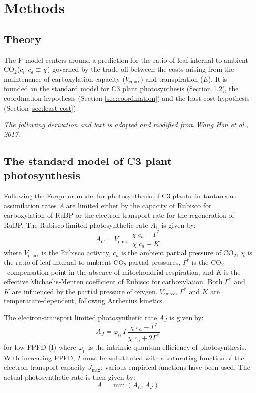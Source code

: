 \documentclass{myreport}
\newcommand{\coo}{CO$_2$}
\begin{document}
\section{Methods}

\subsection{Theory}
\label{sec:theory}
The P-model centers around a prediction for the ratio of leaf-internal to ambient \coo ($c_i : c_a \equiv \chi$) governed by the trade-off between the costs arising from the maintenance of carboxylation capacity ($V_{\mathrm{cmax}}$) and transpiration ($E$). 
It is founded on the standard model for C3 plant photosynthesis (Section \ref{sec:farquhar}), the coordination hypothesis (Section \ref{sec:coordination}) and the least-cost hypothesis (Section \ref{sec:least-cost}).

\textit{The following derivation and text is adopted and modified from Wang Han et al., 2017.}\\

\subsection{The standard model of C3 plant photosynthesis}
\label{sec:farquhar}
Following the Farquhar model for photosynthesis of C3 plants, instantaneous assimilation rates $A$ are limited either by the capacity of Rubisco for carboxylation of RuBP or the electron transport rate for the regeneration of RuBP. 
The Rubisco-limited photosynthetic rate $A_C$ is given by:
\begin{equation}
\label{eq:rubiscolimited}
    A_C = V_{\mathrm{cmax}} \; \frac{\chi\;c_a-\Gamma^{\ast}}{\chi\;c_a + K}
\end{equation}
where $V_{\mathrm{cmax}}$ is the Rubisco activity, $c_a$ is the ambient partial pressure of CO$_2$, $\chi$ is the ratio of leaf-internal to ambient CO$_2$ partial pressures, $\Gamma^{\ast}$ is the \coo\ compensation point in the absence of mitochondrial respiration, and $K$ is the effective Michaelis-Menten coefficient of Rubisco for carboxylation. 
Both $\Gamma^{\ast}$ and $K$ are influenced by the partial pressure of oxygen. 
$V_{\mathrm{cmax}}$, $\Gamma^{\ast}$ and $K$ are temperature-dependent, following Arrhenius kinetics.

The electron-transport limited photosynthetic rate $A_J$ is given by:
\begin{equation}
\label{eq:lightlimited}
    A_J = \varphi_0 \; I\; \frac{\chi \; c_a - \Gamma^{\ast}}{\chi\;c_a + 2\Gamma^{\ast}}
\end{equation}
for low PPFD (I) where $\varphi_0$ is the intrinsic quantum efficiency of photosynthesis. 
With increasing PPFD, $I$ must be substituted with a saturating function of the electron-transport capacity $J_{\mathrm{max}}$; various empirical functions have been used. 
The actual photosynthetic rate is then given by:
\begin{equation}
    A = \min(A_C, A_J)
\end{equation}
\end{document}
